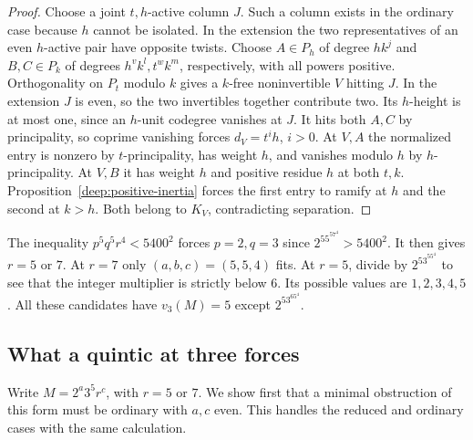 \documentclass[11pt,a4paper]{article}
\numberwithin{equation}{section}
\theoremstyle{remark}
\begin{document}
\begin{proof}
Choose a joint $t,h$-active column $J$. Such a column exists in the
ordinary case because $h$ cannot be isolated. In the extension the
two representatives of an even $h$-active pair have opposite twists. Choose
$A\in P_h$ of degree $hk^j$ and $B,C\in P_k$ of degrees
$h^v k^l,t^w k^m$, respectively, with all powers positive.
Orthogonality on $P_t$ modulo $k$ gives a $k$-free noninvertible
$V$ hitting $J$. In the extension $J$ is even, so the two
invertibles together contribute two. Its $h$-height is at most one,
since an $h$-unit codegree vanishes at $J$. It hits both $A,C$ by
principality, so coprime vanishing forces $d_V=t^i h$, $i>0$.
At $V,A$ the normalized entry is nonzero by $t$-principality,
has weight $h$, and vanishes modulo $h$ by $h$-principality.
At $V,B$ it has weight $h$ and positive residue $h$ at both $t,k$.
Proposition~\ref{deep:positive-inertia} forces the first entry
to ramify at $h$ and the second at $k>h$. Both belong to $K_V$,
contradicting separation.
\end{proof}

The inequality $p^5q^5r^4<5400^2$ forces $p=2,q=3$ since $2^55^57^4>5400^2$. It then gives $r=5$ or $7$.
At $r=7$ only $(a,b,c)=(5,5,4)$ fits. At $r=5$, divide by
$2^53^55^4$ to see that the integer multiplier is strictly below
$6$. Its possible values are $1,2,3,4,5$. All these candidates have $v_3(M)=5$
except $2^53^65^4$.

\subsection{What a quintic at three forces}
Write $M=2^a3^5r^c$, with $r=5$ or $7$. We show first that a minimal
obstruction of this form must be ordinary with $a,c$ even. This
handles the reduced and ordinary cases with the same calculation.
\end{document}
